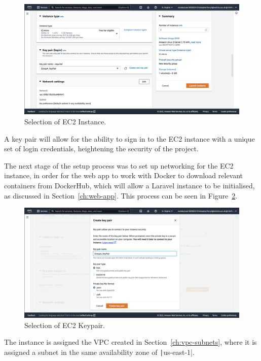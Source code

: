 \begin{figure}[!htbp]
    \centering
    \includegraphics[width=\textwidth]{resources/ec2/create-instance-instance-type}
    \caption{Selection of EC2 Instance.}
    \label{fig:ec2-instance}
\end{figure}

A key pair will allow for the ability to sign in to the EC2 instance with a unique set of login credentials, heightening
the security of the project.

The next stage of the setup process was to set up networking for the EC2 instance, in order for the web app to work with
Docker to download relevant containers from DockerHub, which will allow a Laravel instance to be initialised, as
discussed in Section~\ref{ch:web-app}.
This process can be seen in Figure~\ref{fig:ec2-keypair}.

\begin{figure}[!htbp]
    \centering
    \includegraphics[width=\textwidth]{resources/ec2/create-key-pair}
    \caption{Selection of EC2 Keypair.}
    \label{fig:ec2-keypair}
\end{figure}

The instance is assigned the VPC created in Section~\ref{ch:vpc-subnets}, where it is assigned a subnet in the same
availability zone of \texttt|us-east-1|.

